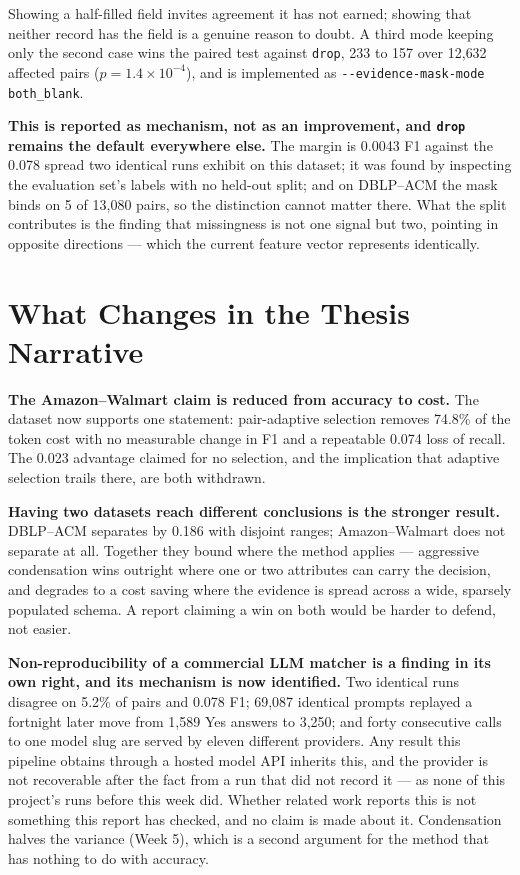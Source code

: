 \documentclass[11pt]{article}
\begin{document}
Showing a half-filled field invites agreement it has not earned; showing that neither record
has the field is a genuine reason to doubt. A third mode keeping only the second case wins the
paired test against \texttt{drop}, 233 to 157 over 12{,}632 affected pairs
($p = 1.4\times10^{-4}$), and is implemented as \texttt{-{-}evidence-mask-mode both\_blank}.

\textbf{This is reported as mechanism, not as an improvement, and \texttt{drop} remains the
default everywhere else.} The margin is 0.0043 F1 against the 0.078 spread two identical runs
exhibit on this dataset; it was found by inspecting the evaluation set's labels with no
held-out split; and on DBLP--ACM the mask binds on 5 of 13{,}080 pairs, so the distinction
cannot matter there. What the split contributes is the finding that missingness is not one
signal but two, pointing in opposite directions --- which the current feature vector
represents identically.

\section{What Changes in the Thesis Narrative}

\textbf{The Amazon--Walmart claim is reduced from accuracy to cost.} The dataset now supports
one statement: pair-adaptive selection removes 74.8\% of the token cost with no measurable
change in F1 and a repeatable 0.074 loss of recall. The 0.023 advantage claimed for no
selection, and the implication that adaptive selection trails there, are both withdrawn.

\textbf{Having two datasets reach different conclusions is the stronger result.} DBLP--ACM
separates by 0.186 with disjoint ranges; Amazon--Walmart does not separate at all. Together
they bound where the method applies --- aggressive condensation wins outright where one or
two attributes can carry the decision, and degrades to a cost saving where the evidence is
spread across a wide, sparsely populated schema. A report claiming a win on both would be
harder to defend, not easier.

\textbf{Non-reproducibility of a commercial LLM matcher is a finding in its own right, and
its mechanism is now identified.} Two identical runs disagree on 5.2\% of pairs and 0.078 F1;
69{,}087 identical prompts replayed a fortnight later move from 1{,}589 Yes answers to
3{,}250; and forty consecutive calls to one model slug are served by eleven different
providers. Any result this pipeline obtains through a hosted model API inherits this, and the
provider is not recoverable after the fact from a run that did not record it --- as none of
this project's runs before this week did. Whether related work reports this is not something
this report has checked, and no claim is made about it. Condensation halves the variance
(Week 5), which is a second argument for the method that has nothing to do with accuracy.
\end{document}

